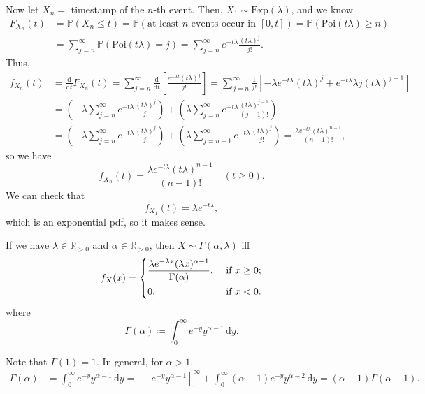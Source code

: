 Now let \(X_n = \) timestamp of the \(n\)-th event. Then, \(X_1 \sim \mathrm{Exp}(\lambda )\), and we know 
\begin{align*}
    F_{X_n}(t) &= \mathbb{P} (X_n \le t) = \mathbb{P} (\text{at least } n \text{ events occur in } [0, t]) = \mathbb{P} (\mathrm{Poi}(t \lambda ) \ge n ) \\
    &= \sum_{j=n}^{\infty} \mathbb{P} (\mathrm{Poi}(t \lambda ) = j) = \sum_{j=n}^{\infty} e^{-t \lambda} \frac{(t \lambda )^j}{j!}.  
\end{align*}   
Thus,
\begin{align*}
    f_{X_n}(t) &= \frac{\mathrm{d}}{\mathrm{d}t} F_{X_n}(t) = \sum_{j=n}^{\infty} \frac{\mathrm{d}}{\mathrm{d}t} \left[ \frac{e^{-\lambda t} (t \lambda )^j}{j!} \right] = \sum_{j=n}^{\infty} \frac{1}{j!} \left[ - \lambda e^{-t \lambda } (t \lambda )^j + e^{-t \lambda } \lambda j (t \lambda )^{j - 1} \right] \\
    &= \left( -\lambda \sum_{j=n}^{\infty} e^{-t \lambda} \frac{(t \lambda )^j}{j!}  \right) + \left( \lambda \sum_{j=n}^{\infty} e^{-t \lambda} \frac{(t \lambda )^{j-1}}{(j-1)!}  \right) \\
    &= \left( -\lambda \sum_{j=n}^{\infty} e^{-t \lambda} \frac{(t \lambda )^j}{j!}  \right) + \left( \lambda \sum_{j=n-1}^{\infty} e^{-t \lambda} \frac{(t \lambda )^j}{j!}  \right) = \frac{\lambda e^{-t \lambda } (t \lambda)^{n - 1}}{(n - 1)!},         
\end{align*}
so we have 
\[
    f_{X_n}(t) = \frac{\lambda e^{-t \lambda } (t \lambda)^{n - 1}}{(n - 1)!} \quad (t \ge 0). 
\]
We can check that 
\[
    f_{X_1}(t) = \lambda e^{-t \lambda },
\]
which is an exponential pdf, so it makes sense. 

\begin{definition}
    If we have \(\lambda \in \mathbb{R} _{> 0}\) and \(\alpha \in \mathbb{R} _{> 0}\), then \(X \sim \Gamma (\alpha , \lambda )\) iff 
    \[
        f_X(x) = \begin{dcases}
            \frac{\lambda e^{-\lambda x} (\lambda x)^{\alpha  - 1}}{\Gamma (\alpha)}, &\text{ if } x \ge 0 ;\\
            0, &\text{ if } x < 0.
        \end{dcases}
    \]   
    where 
    \[
        \Gamma (\alpha ) \coloneqq \int _0^{\infty} e^{-y} y^{\alpha - 1} \, \mathrm{d} y. 
    \]
\end{definition}

Note that \(\Gamma (1) = 1\). In general, for \(\alpha > 1\),
\begin{align*}
    \Gamma (\alpha ) &= \int _0^{\infty } e^{-y} y^{\alpha - 1} \, \mathrm{d} y = \left[ -e^{-y} y^{\alpha - 1}  \right]_0^{\infty } + \int _0^{\infty} (\alpha - 1) e^{-y} y^{\alpha - 2} \, \mathrm{d} y = (\alpha - 1) \Gamma (\alpha - 1).   
\end{align*} 

